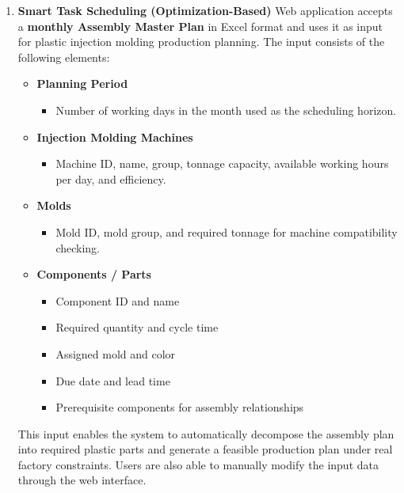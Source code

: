\begin{enumerate}[leftmargin=80pt]
    \item \textbf{Smart Task Scheduling (Optimization-Based)} 
    Web application accepts a \textbf{monthly Assembly Master Plan} in Excel format 
    and uses it as input for plastic injection molding production planning. 
    The input consists of the following elements:

    \begin{itemize}
  \item \textbf{Planning Period}
  \begin{itemize}
    \item Number of working days in the month used as the scheduling horizon.
  \end{itemize}

  \item \textbf{Injection Molding Machines}
  \begin{itemize}
    \item Machine ID, name, group, tonnage capacity, available working hours per day, and efficiency.
  \end{itemize}

  \item \textbf{Molds}
  \begin{itemize}
    \item Mold ID, mold group, and required tonnage for machine compatibility checking.
  \end{itemize}

  \item \textbf{Components / Parts}
  \begin{itemize}
    \item Component ID and name
    \item Required quantity and cycle time
    \item Assigned mold and color
    \item Due date and lead time
    \item Prerequisite components for assembly relationships
  \end{itemize}

  \end{itemize}


This input enables the system to automatically decompose the assembly plan into required plastic parts and generate a feasible production plan under real factory constraints. Users are also able to manually modify the input data through the web interface.



\end{enumerate}

